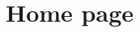 \documentclass[../../DD.tex]{subfiles}
\begin{document}
\newpage
\section{Home page \label{sect:2.1}}


	
\end{document}

